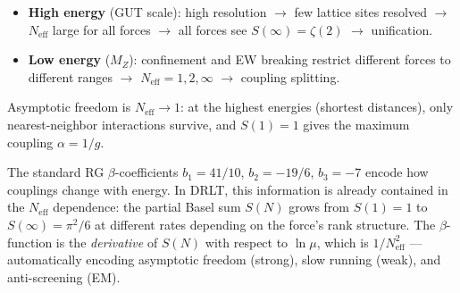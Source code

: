 \begin{itemize}
\item \textbf{High energy} (GUT scale): high resolution $\to$ few lattice sites resolved $\to$ $N_\text{eff}$ large for all forces $\to$ all forces see $S(\infty) = \zeta(2)$ $\to$ unification.
\item \textbf{Low energy} ($M_Z$): confinement and EW breaking restrict different forces to different ranges $\to$ $N_\text{eff} = 1, 2, \infty$ $\to$ coupling splitting.
\end{itemize}

Asymptotic freedom is $N_\text{eff} \to 1$: at the highest energies (shortest distances), only nearest-neighbor interactions survive, and $S(1) = 1$ gives the maximum coupling $\alpha = 1/g$.

\begin{remark}
The standard RG $\beta$-coefficients $b_1 = 41/10$, $b_2 = -19/6$, $b_3 = -7$ encode how couplings change with energy. In DRLT, this information is already contained in the $N_\text{eff}$ dependence: the partial Basel sum $S(N)$ grows from $S(1) = 1$ to $S(\infty) = \pi^2/6$ at different rates depending on the force's rank structure. The $\beta$-function is the \emph{derivative} of $S(N)$ with respect to $\ln\mu$, which is $1/N_\text{eff}^2$ --- automatically encoding asymptotic freedom (strong), slow running (weak), and anti-screening (EM).
\end{remark}
